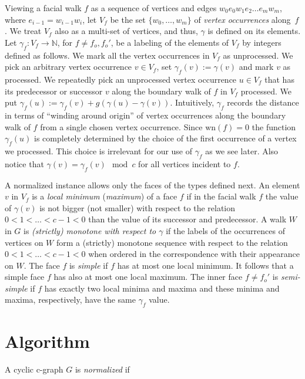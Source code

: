 \documentclass{llncs}
\def\wn{\mathrm{wn}}
\begin{document}
Viewing a facial walk $f$ as a sequence of vertices and edges $w_0e_0w_1e_2\ldots e_mw_m$, where $e_{i-1}=w_{i-1}w_i$,
let $V_f$ be the set $\{w_0,\ldots, w_m\}$ of \emph{vertex occurrences} along~$f$.
We treat $V_f$ also as a multi-set of vertices, and thus, $\gamma$ is defined on its elements.
Let $\gamma_f:V_f \rightarrow \mathbb{N}$, for $f\not=f_o,f_o'$, be a labeling of the elements of $V_f$ by integers defined as follows.
We mark all the vertex occurrences  in $V_f$ as unprocessed.
We pick an arbitrary vertex occurrence  $v\in V_f$, set $\gamma_f(v):=\gamma(v)$
and mark $v$ as processed.
We repeatedly pick an unprocessed vertex occurrence  $u\in V_f$ that has its predecessor or successor $v$ along the boundary walk of $f$ in $V_f$  processed.
 We put  $\gamma_f(u):=\gamma_f(v)+g(\gamma(u)-\gamma(v))$.
 Intuitively, $\gamma_f$ records 
 the distance  in terms of ``winding around origin'' of vertex occurrences 
 along the boundary walk of $f$ from a single chosen vertex occurrence.
 Since $\wn(f)=0$ the function  $\gamma_f(u)$ is completely determined by
the choice of the  first occurrence of a vertex we processed. 
This choice is irrelevant for our use of $\gamma_f$ as we see later.
Also notice that $\gamma(v) = \gamma_f(v) \mod c$ for all vertices incident to $f$.

A normalized instance allows only the faces of the types defined next.
An element $v$ in $V_f$ is a \emph{local minimum} (\emph{maximum}) of a face $f$ if in the  facial walk  $f$ the value of $\gamma(v)$ is not bigger (not smaller)
with respect to the  relation $0<1<\ldots <c-1<0$  than the value of its successor and predecessor.
A walk $W$ in $G$ is \emph{(strictly) monotone with respect to $\gamma$} if the labels of the occurrences of vertices on $W$ form a (strictly) monotone sequence
with respect to the  relation $0<1<\ldots <c-1<0$ when ordered
in the correspondence with their appearance on  $W$.
The  face $f$ is \emph{simple} if $f$ has at most one local minimum. It follows 
that a simple face $f$ has also at most one local maximum.
The inner face   $f\not=f_o'$ is \emph{semi-simple}  if $f$ has exactly two local minima and maxima and these minima and maxima, respectively,  have the same $\gamma_f$ value.



\section{Algorithm}
 \label{sec:alg}

A cyclic c-graph $G$ is \emph{normalized } if 
\end{document}

